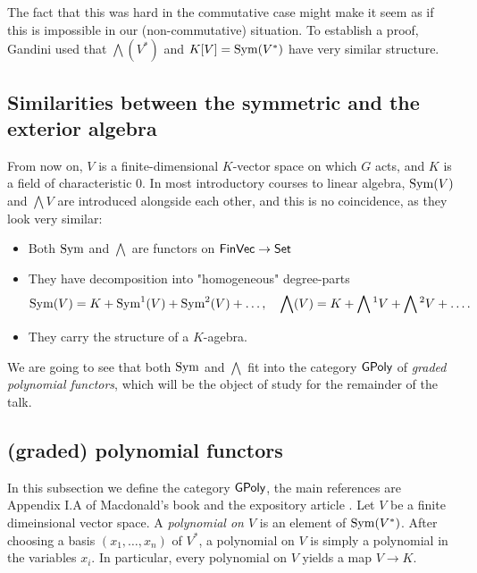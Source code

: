 \documentclass[../main.tex]{subfiles}
\begin{document}
The fact that this was hard in the commutative
case might make it seem as if this is impossible in our (non-commutative)
situation. To establish a proof, Gandini used that 
$\bigwedge(V^*)$ and $K[V] = \operatorname{Sym}(V^*)$ have very similar structure. 

\subsection{Similarities between the symmetric and the exterior algebra} %
\label{sub:Similarities between the symmetric and the exterior algebra}
From now on, $V$ is a finite-dimensional $K$-vector space on which 
$G$ acts, and $K$ is a field of characteristic $0$.
In most introductory courses to linear algebra, $\operatorname{Sym}(V)$ and $\bigwedge V$ are
introduced alongside each other, and this is no coincidence, as they look very
similar:
\begin{itemize}[wide,labelindent=0pt]
    \item Both $\operatorname{Sym}$ and $\bigwedge$ are functors on $\textnormal{$\textsf{FinVec}$} \to \textnormal{$\textsf{Set}$}$
    \item They have decomposition into "homogeneous" degree-parts 
        \begin{equation*}
            \operatorname{Sym}(V) = K + \operatorname{Sym}^1(V) + \operatorname{Sym}^2(V) + \dots, \quad \bigwedge(V) =
            K + \bigwedge{}^1V + \bigwedge{}^2V + \dots.
        \end{equation*}
    \item They carry the structure of a $K$-agebra.
\end{itemize}
We are going to see that both $\operatorname{Sym}$ and $\bigwedge$ fit into the category $\textnormal{$\textsf{GPoly}$}$ of 
\emph{graded polynomial functors}, which will be the object of study for the remainder
of the talk.

\subsection{(graded) polynomial functors}
In this subsection we define the category $\textnormal{$\textsf{GPoly}$}$, the main references are 
Appendix I.A of Macdonald's book \cite{macdonald1998symmetric} and the expository
article \cite{sam2012introduction}.
Let $V$ be a finite dimeinsional vector space. A \emph{polynomial on $V$}
is an element of $\operatorname{Sym}(V^*)$. After choosing a basis $(x_1, \dots, x_n)$ of 
$V^*$, a polynomial on $V$ is simply a polynomial in the variables $x_i$. In particular,
every polynomial on $V$ yields a map $V \to K$.
\end{document}
